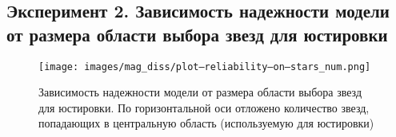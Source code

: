 
%
%

\newpage
\subsection{Эксперимент 2. Зависимость надежности модели от размера области выбора звезд для юстировки}

\begin{figure}[H]
  \centering
  \texttt{[image: images/mag\_diss/plot--reliability--on--stars\_num.png]}
  \caption{Зависимость надежности модели от размера области выбора звезд для юстировки. По горизонтальной оси отложено количество звезд, попадающих в центральную область (используемую для юстировки)}
  \label{fig:subpix_function}
\end{figure}



